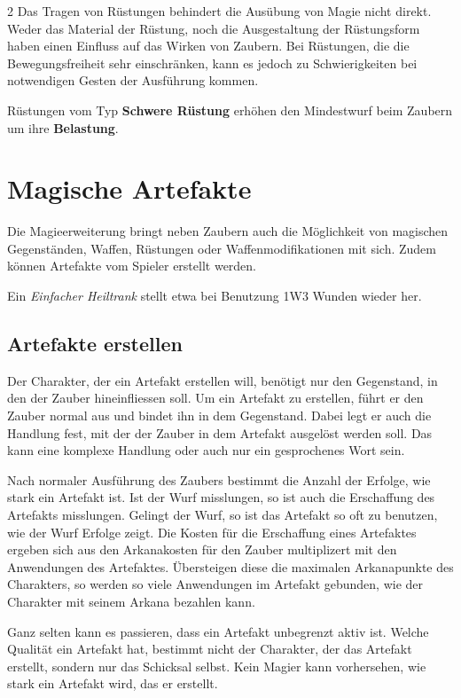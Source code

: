 \begin{multicols}{2}
Das Tragen von Rüstungen behindert die Ausübung von Magie nicht direkt. Weder das Material der Rüstung, noch die Ausgestaltung der Rüstungsform haben einen Einfluss auf das Wirken von Zaubern. Bei Rüstungen, die die Bewegungsfreiheit sehr einschränken, kann es jedoch zu Schwierigkeiten bei notwendigen Gesten der Ausführung kommen.

Rüstungen vom Typ \textbf{Schwere Rüstung} erhöhen den Mindestwurf beim Zaubern um ihre \textbf{Belastung}.

\section{Magische Artefakte}

Die Magieerweiterung bringt neben Zaubern auch die Möglichkeit von magischen Gegenständen, Waffen, Rüstungen oder Waffenmodifikationen mit sich. Zudem können Artefakte vom Spieler erstellt werden.

Ein \textit{Einfacher Heiltrank} stellt etwa bei Benutzung 1W3 Wunden wieder her.

\subsection{Artefakte erstellen}

Der Charakter, der ein Artefakt erstellen will, benötigt nur den Gegenstand, in den der Zauber hineinfliessen soll. Um ein Artefakt zu erstellen, führt er den Zauber normal aus und bindet ihn in dem Gegenstand. Dabei legt er auch die Handlung fest, mit der der Zauber in dem Artefakt ausgelöst werden soll. Das kann eine komplexe Handlung oder auch nur ein gesprochenes Wort sein.

Nach normaler Ausführung des Zaubers bestimmt die Anzahl der Erfolge, wie stark ein Artefakt ist. Ist der Wurf misslungen, so ist auch die Erschaffung des Artefakts misslungen. Gelingt der Wurf, so ist das Artefakt so oft zu benutzen, wie der Wurf Erfolge zeigt. Die Kosten für die Erschaffung eines Artefaktes ergeben sich aus den Arkanakosten für den Zauber multiplizert mit den Anwendungen des Artefaktes. Übersteigen diese die maximalen Arkanapunkte des Charakters, so werden so viele Anwendungen im Artefakt gebunden, wie der Charakter mit seinem Arkana bezahlen kann.

Ganz selten kann es passieren, dass ein Artefakt unbegrenzt aktiv ist. Welche Qualität ein Artefakt hat, bestimmt nicht der Charakter, der das Artefakt erstellt, sondern nur das Schicksal selbst. Kein Magier kann vorhersehen, wie stark ein Artefakt wird, das er erstellt.


\end{multicols}
